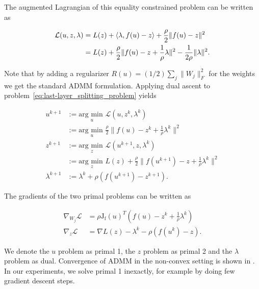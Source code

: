 \documentclass[english,11pt,a4paper]{article}
\begin{document}
The augmented Lagrangian of this equality constrained problem can be written as

\begin{equation}
	\begin{aligned}
		\mathcal{L}(u, z, \lambda)
		&= L(z) + \langle \lambda, f(u)-z \rangle + \frac{\rho}{2} \| f(u)-z \|^2 \\
		&= L(z) + \frac{\rho}{2} \| f(u) - z + \frac{1}{\rho} \lambda \|^2 - \frac{1}{2 \rho} \| \lambda \|^2.
	\end{aligned}
\end{equation}

Note that by adding a regularizer $R(u) = (1/2) \sum_{j} \| W_j \|^2_F$ for the weights we get the standard ADMM formulation. Applying dual ascent to problem~\ref{eq:last-layer_splitting_problem} yields

\begin{equation}
	\begin{aligned}
		u^{k+1} &:= \underset{u}{\text{arg min }} \mathcal{L}(u, z^k, \lambda^k) \\
		&:= \underset{u}{\text{arg min }} \frac{\rho}{2} \| f(u) - z^k + \frac{1}{\rho} \lambda^k \|^2 \\
	
		z^{k+1} &:= \underset{z}{\text{arg min }} \mathcal{L}(u^{k+1}, z, \lambda^k) \\
		&:= \underset{z}{\text{arg min }} L(z) + \frac{\rho}{2} \| f(u^{k+1}) - z + \frac{1}{\rho} \lambda^k \|^2 \\
		
		\lambda^{k+1} &:= \lambda^k + \rho (f(u^{k+1})-z^{k+1}).
	\end{aligned}
\end{equation}

The gradients of the two primal problems can be written as

\begin{equation}
	\begin{aligned}
		\nabla_{W_j} \mathcal{L} &= \rho \mathrm{J_f}(u)^T (f(u) - z^k + \frac{1}{\rho} \lambda^k) \\
		\nabla_z \mathcal{L} &= \nabla L(z) - \lambda^k - \rho (f(u^k) - z).
	\end{aligned}
\end{equation}

We denote the $u$ problem as primal 1, the $z$ problem as primal 2 and the $\lambda$ problem as dual. Convergence of ADMM in the non-convex setting is shown in \cite{hong2016convergence}. In our experiments, we solve primal 1 inexactly, for example by doing few gradient descent steps.
\end{document}
